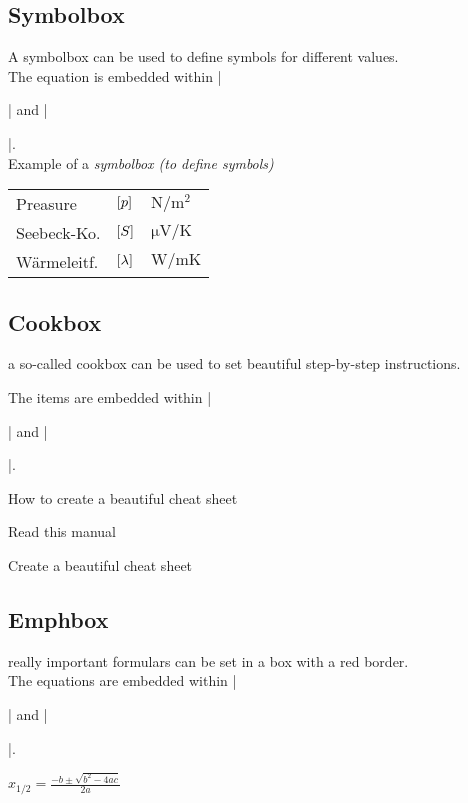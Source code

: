 \documentclass[english]{latex4ei/latex4ei_sheet}
\begin{document}
\begin{sectionbox}
	\subsection{Symbolbox}
	A symbolbox can be used to define symbols for different values. \\

	The equation is embedded within \code|\begin{symbolbox}| and 
	\code|\end{symbolbox}|. \\

	Example of a \emph{symbolbox (to define symbols)}
	\renewcommand{\arraystretch}{2.0}
	\begin{symbolbox}
		\begin{tabular}{lll}
		Preasure & $\left[p\right]$ & $\si{\newton\per\meter\squared}$ \\
		Seebeck-Ko. & $\left[S\right]$ & $\si{\micro\volt\per\kelvin}$\\
		Wärmeleitf. & $\left[\lambda\right]$ & $\si{\watt\per\meter\kelvin}$
		\end{tabular}
	\end{symbolbox}	
\end{sectionbox}


\begin{sectionbox}
	\subsection{Cookbox}
	a so-called cookbox can be used to set beautiful step-by-step instructions.

	The items are embedded within \code|\begin{cookbox}| and 
	\code|\end{cookbox}|. \\

	\begin{cookbox}{How to create a beautiful cheat sheet}
		\item Read this manual
		\item Create a beautiful cheat sheet
	\end{cookbox}
\end{sectionbox}


\begin{sectionbox}
	\subsection{Emphbox}
	really important formulars can be set in a box with a red border. \\

	The equations are embedded within \code|\begin{emphbox}| and 
	\code|\end{emphbox}|. \\

	\begin{emphbox}
		$x_{1/2}=\frac{ -b \pm \sqrt{b^2-4ac} }{ 2a }$
	\end{emphbox}
\end{sectionbox}
\end{document}
